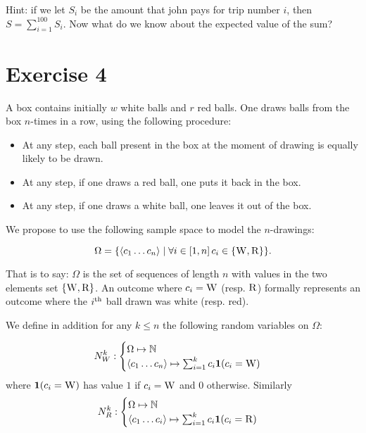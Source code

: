 \documentclass{article}
\begin{document}
Hint: if we let $S_i$ be the amount that john pays for trip number $i$, then $S = \sum^{100}_{i = 1} S_i$. Now what do we know about the expected value of the sum?



\section*{Exercise 4}
A box contains initially $w$ white balls and $r$ red balls. One draws balls from the box $n$-times in a row, using the following procedure:
\begin{itemize}
\item At any step, each ball present in the box at the moment of drawing is equally likely to be drawn.
\item At any step, if one draws a red ball, one puts it back in the box.
\item At any step, if one draws a white ball, one leaves it out of the box.
\end{itemize}

We propose to use the following sample space to model the $n$-drawings:

\[ \Omega = \{ \langle c_1 \dots c_n \rangle \mid \forall i \in [1,n]\, c_i \in \{\textsc{W}, \textsc{R}\} \}. \]

That is to say: $\Omega$ is the set of sequences of length $n$ with values in the two elements set $\{\textsc{W}, \textsc{R}\}$. An outcome where $c_i = \textsc{W}$ (resp. $\textsc{R}$) formally represents an outcome where the $i^{\textnormal{th}}$ ball drawn was white (resp. red). 

We define in addition for any $k \le n$ the following random variables on $\Omega$:

\[N^k_W: \begin{cases} \Omega \mapsto \mathbb{N}\\ \langle c_1 \dots c_n \rangle \mapsto \sum^k_{i = 1} c_i \mathbf{1}(c_i = {\textsc{W}}) \end{cases}\]
where $\mathbf{1}(c_i = \textsc{W})$ has value $1$ if $c_i = \textsc{W}$ and $0$ otherwise. Similarly 
\[N^k_R: \begin{cases} \Omega \mapsto \mathbb{N}\\ \langle c_1 \dots c_i \rangle \mapsto \sum^k_{i = 1} c_i \mathbf{1}(c_i = {\textsc{R}}) \end{cases}\]
\end{document}

